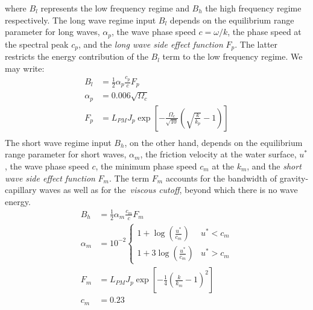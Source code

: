 %
where $B_l$ represents the low frequency regime and $B_h$ the high frequency
regime respectively.
The long wave regime input $B_l$ depends on the
equilibrium range parameter for long waves, $\alpha_p$, the wave phase speed
$c = \omega/k$, the phase speed at the spectral peak $c_p$, and the \emph{long wave side
effect function} $F_p$. The latter restricts the energy contribution of the
$B_l$ term to the low frequency regime.
We may write:
\begin{align*}
 B_l &= \frac{1}{2}\alpha_p\frac{c_p}{c}F_p \\
 \alpha_p &= 0.006\sqrt{\Omega_c} \\
 F_p &= L_{PM}J_p\exp\left[- 
\frac{\Omega_c}{\sqrt{10}}\left(\sqrt{\frac{k}{k_p}} - 1\right)\right] \\
\end{align*}
The short wave regime input $B_h$,
on the other hand, depends on the equilibrium range parameter for short waves,
$\alpha_m$, the friction velocity at the water surface, $u^{\ast}$, the wave
phase speed $c$, the minimum phase speed $c_m$ at the \wavenumber $k_m$, and
the \emph{short wave side effect function} $F_m$. The term $F_m$ accounts for
the bandwidth of gravity-capillary waves as well as for the~\emph{viscous cutoff},
beyond which there is no wave energy. 
\begin{align*}
 B_h &= \frac{1}{2}\alpha_m\frac{c_m}{c}F_m \\
 \alpha_m &= 10^{-2}\begin{cases}
	1 + \log\left(\frac{u^{\ast}}{c_m}\right) & u^{\ast} < c_m \\
	1 + 3\log\left(\frac{u^{\ast}}{c_m}\right) & u^{\ast} > c_m
	\end{cases} \\
 F_m &= L_{PM}J_p\exp\left[- 
\frac{1}{4}\left(\frac{k}{k_m} - 1\right)^2\right] \\
c_m &= 0.23
\end{align*}

